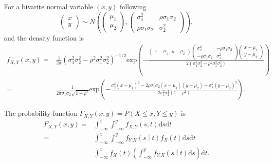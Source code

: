 \documentclass[a4paper,12pt]{article}
\begin{document}
For a bivarite normal variable $\left(x, y\right)$ following
\[
  \begin{pmatrix}
    x    \\
    y
  \end{pmatrix}
  \sim N\left(
    \begin{pmatrix}
      \mu_1    \\
      \mu_2
    \end{pmatrix},
    \begin{pmatrix}
      \sigma_1^2 & \rho\sigma_1\sigma_2    \\
      \rho\sigma_1\sigma_2 & \sigma_2^2
    \end{pmatrix}
  \right)
  ,
\]
and the density function is
\[
  \begin{aligned}
    f_{X, Y}\left(x, y\right) =&
    \frac{1}{2\pi}
    \left(\sigma_1^2\sigma_2^2 - \rho^2\sigma_1^2\sigma_2^2\right)^{-1 / 2}
    \mathrm{exp}\left(
      - \frac{
        \begin{pmatrix}
          x - \mu_1 & y - \mu_2
        \end{pmatrix}
        \begin{pmatrix}
          \sigma_2^2 & -\rho\sigma_1\sigma_2    \\
          -\rho\sigma_1\sigma_2 & \sigma_1^2
        \end{pmatrix}
        \begin{pmatrix}
          x - \mu_1    \\
          y - \mu_2
        \end{pmatrix}
      }{
        2\left(
          \sigma_1^2\sigma_2^2 - \rho^2\sigma_1^2\sigma_2^2
        \right)}    
    \right)    \\
    =& \frac{1}{
      2\pi\sigma_1\sigma_2\sqrt{1 - \rho^2}}
    \mathrm{exp}\left(
      -
      \frac{
        \sigma_2^2\left(x - \mu_1\right)^2
        -2\rho\sigma_1\sigma_2\left(x - \mu_1\right)\left(y - \mu_2\right)
        + \sigma_1^2\left(y - \mu_2\right)^2
      }{
        2\sigma_1^2\sigma_2^2\left(1 - \rho^2\right)
      }
    \right)
    .
  \end{aligned}
\]

The probability function $F_{X, Y}\left(x, y\right) = P\left(X \leq x, Y \leq y\right)$ is
\[
  \begin{aligned}
    F_{X, Y}\left(x, y\right)
    =& \int_{-\infty}^x\int_{-\infty}^y f_{X, Y}\left(s, t\right)\mathrm{d}s\mathrm{d}t    \\
    =& \int_{-\infty}^x\int_{-\infty}^y f_{Y|X}\left(s\middle|t\right)f_{X}\left(t\right)\mathrm{d}s\mathrm{d}t    \\
    =& \int_{-\infty}^x f_X\left(t\right)
    \left(
      \int_{-\infty}^y f_{Y|X}\left(s\middle|t\right) \mathrm{d}s
    \right)
    \mathrm{d}t
    .
  \end{aligned}
\]
\end{document}
